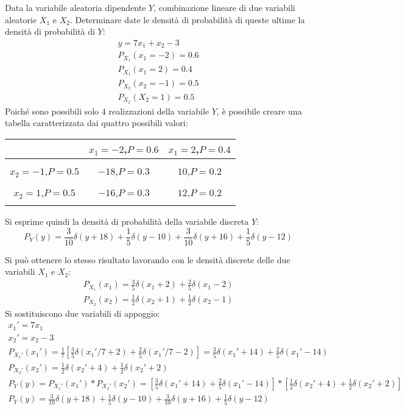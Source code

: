\documentclass{article}
\begin{document}
Data la variabile aleatoria dipendente $Y$, combinazione lineare di due variabili aleatorie $X_1$ e $X_2$. Determinare date le densità di probabilità 
di queste ultime la densità di probabilità di $Y$:
\begin{gather*}
    y=7x_1+x_2-3\\
    P_{X_1}(x_1=-2)=0.6\\
    P_{X_1}(x_1=2)=0.4\\
    P_{X_2}(x_2=-1)=0.5\\
    P_{X_2}(X_2=1)=0.5
\end{gather*}
Poiché sono possibili solo $4$ realizzazioni della variabile $Y$, è possibile creare una tabella caratterizzata dai quattro possibili valori:
\begin{center}
    \begin{tabular}{c|c|c|}
        &$x_1=-2$,$P=0.6$&$x_1=2$,$P=0.4$\\
        \hline\\
        $x_2=-1$,$P=0.5$&$-18$,$P=0.3$&$10$,$P=0.2$\\
        \hline\\
        $x_2=1$,$P=0.5$ &$-16$,$P=0.3$ &$12$,$P=0.2$\\
        \hline\\
    \end{tabular}
\end{center}
Si esprime quindi la densità di probabilità della variabile discreta $Y$:
\begin{equation}
    P_Y(y)=\displaystyle\frac{3}{10}\delta(y+18)+\frac{1}{5}\delta(y-10)+\frac{3}{10}\delta(y+16)+\frac{1}{5}\delta(y-12)
\end{equation}

Si può ottenere lo stesso risultato lavorando con le densità discrete delle due variabili $X_1$ e $X_2$:
\begin{gather*}
    P_{X_1}(x_1)=\displaystyle\frac{3}{5}\delta(x_1+2)+\frac{2}{5}\delta(x_1-2)\\
    P_{X_2}(x_2)=\displaystyle\frac{1}{2}\delta(x_2+1)+\frac{1}{2}\delta(x_2-1)
\end{gather*}
Si sostituiscono due variabili di appoggio:
\begin{gather*}
    x_1'=7x_1\\
    x_2'=x_2-3\\
    P_{X_1'}(x_1')=\displaystyle\frac{1}{7}\left[\frac{3}{5}\delta(x_1'/7+2)+\frac{2}{5}\delta(x_1'/7-2)\right]=\frac{3}{5}\delta(x_1'+14)+\frac{2}{5}\delta(x_1'-14)\\
    P_{X_2'}(x_2')=\displaystyle\frac{1}{2}\delta(x_2'+4)+\frac{1}{2}\delta(x_2'+2)\\
    P_Y(y)=P_{X_1'}(x_1')*P_{X_2'}(x_2')=\left[\displaystyle\frac{3}{5}\delta(x_1'+14)+\frac{2}{5}\delta(x_1'-14)\right]*\left[\frac{1}{2}\delta(x_2'+4)+\frac{1}{2}\delta(x_2'+2)\right]\\
    P_Y(y)=\displaystyle\frac{3}{10}\delta(y+18)+\frac{1}{5}\delta(y-10)+\frac{3}{10}\delta(y+16)+\frac{1}{5}\delta(y-12)
\end{gather*}
\end{document}
